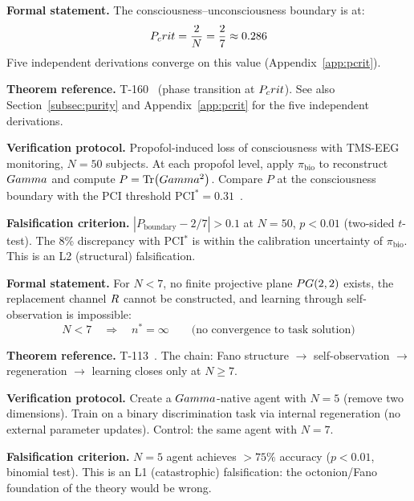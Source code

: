 \begin{predictionbox}
\textbf{Formal statement.}
The consciousness--unconsciousness boundary is at:
\begin{equation}
  P_crit = \frac{2}{N} = \frac{2}{7} \approx 0.286
\end{equation}
Five independent derivations converge on this value (Appendix~\ref{app:pcrit}).

\medskip\noindent
\textbf{Theorem reference.} T-160~ (phase transition at $P_crit$).
See also Section~\ref{subsec:purity} and Appendix~\ref{app:pcrit} for the five
independent derivations.

\medskip\noindent
\textbf{Verification protocol.}
Propofol-induced loss of consciousness with TMS-EEG monitoring, $N = 50$ subjects.
At each propofol level, apply $\pi_{\mathrm{bio}}$ to reconstruct $Gamma$ and compute
$P = \Tr(Gamma^2)$. Compare $P$ at the consciousness boundary with the PCI threshold
$\mathrm{PCI}^* = 0.31$~\cite{casali2013}.

\medskip\noindent
\textbf{Falsification criterion.}
$|P_{\mathrm{boundary}} - 2/7| > 0.1$ at $N = 50$, $p < 0.01$ (two-sided $t$-test).
The 8\% discrepancy with PCI$^*$ is within the calibration uncertainty of $\pi_{\mathrm{bio}}$.
This is an L2 (structural) falsification.
\end{predictionbox}

\begin{predictionbox}[Prediction 10: N=7 minimality for autonomous learning \status{T}]
\textbf{Formal statement.}
For $N < 7$, no finite projective plane $PG(2,2)$ exists, the replacement channel $R$
cannot be constructed, and learning through self-observation is impossible:
\begin{equation}
  N < 7 \quad\Longrightarrow\quad n^* = \infty
  \qquad\text{(no convergence to task solution)}
\end{equation}

\medskip\noindent
\textbf{Theorem reference.} T-113~. The chain: Fano structure $\to$
self-observation $\to$ regeneration $\to$ learning closes only at $N \geq 7$.

\medskip\noindent
\textbf{Verification protocol.}
Create a $Gamma$-native agent with $N = 5$ (remove two dimensions). Train on a binary
discrimination task via internal regeneration (no external parameter updates). Control:
the same agent with $N = 7$.

\medskip\noindent
\textbf{Falsification criterion.}
$N = 5$ agent achieves $> 75\%$ accuracy ($p < 0.01$, binomial test). This is an L1
(catastrophic) falsification: the octonion/Fano foundation of the theory would be wrong.
\end{predictionbox}

